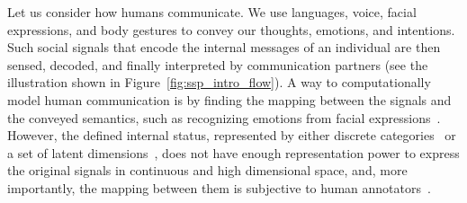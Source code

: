 

Let us consider how humans communicate. We use languages, voice, facial expressions, and body gestures to convey our thoughts, emotions, and intentions. Such social signals that encode the internal messages of an individual are then sensed, decoded, and finally interpreted by communication partners (see the illustration shown in Figure~\ref{fig:ssp_intro_flow}). A way to computationally model human communication is by finding the mapping between the signals and the conveyed semantics, such as recognizing emotions from facial expressions~\cite{zeng2009survey}. However, the defined internal status, represented by either discrete categories~\cite{ekman1969} or a set of latent dimensions~\cite{osgood1952nature, russell1979affective, plutchik2001nature}, does not have enough representation power to express the original signals in continuous and high dimensional space, and, more importantly, the mapping between them is subjective to human annotators~\cite{steidl2005all}. 

